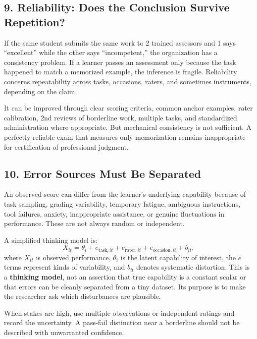 \subsection*{9. Reliability: Does the Conclusion Survive Repetition?}

If the same student submits the same work to 2 trained assessors and 1 says ``excellent'' while the other says ``incompetent,'' the organization has a consistency problem. If a learner passes an assessment only because the task happened to match a memorized example, the inference is fragile. Reliability concerns repeatability across tasks, occasions, raters, and sometimes instruments, depending on the claim.

It can be improved through clear scoring criteria, common anchor examples, rater calibration, 2nd reviews of borderline work, multiple tasks, and standardized administration where appropriate. But mechanical consistency is not sufficient. A perfectly reliable exam that measures only memorization remains inappropriate for certification of professional judgment.

\subsection*{10. Error Sources Must Be Separated}

An observed score can differ from the learner's underlying capability because of task sampling, grading variability, temporary fatigue, ambiguous instructions, tool failures, anxiety, inappropriate assistance, or genuine fluctuations in performance. These are not always random or independent.

A simplified thinking model is:
\begin{equation}
X_{it} = \theta_i + e_{\text{task},it} + e_{\text{rater},it} + e_{\text{occasion},it} + b_{it},
\end{equation}
where $X_{it}$ is observed performance, $\theta_i$ is the latent capability of interest, the $e$ terms represent kinds of variability, and $b_{it}$ denotes systematic distortion. This is a \textbf{thinking model}, not an assertion that true capability is a constant scalar or that errors can be cleanly separated from a tiny dataset. Its purpose is to make the researcher ask which disturbances are plausible.

When stakes are high, use multiple observations or independent ratings and record the uncertainty. A pass-fail distinction near a borderline should not be described with unwarranted confidence.

